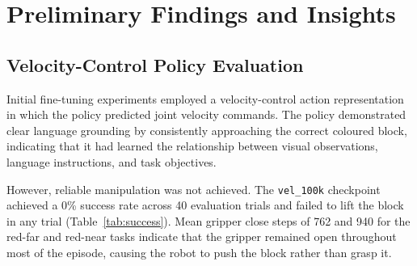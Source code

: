 \documentclass[conference, 12pt]{IEEEtran}
\begin{document}




\section{Preliminary Findings and Insights}
\label{sec:findings}
\subsection{Velocity-Control Policy Evaluation}
Initial fine-tuning experiments employed a velocity-control action representation in which the policy predicted joint velocity commands. The policy demonstrated clear language grounding by consistently approaching the correct coloured block, indicating that it had learned the relationship between visual observations, language instructions, and task objectives.

However, reliable manipulation was not achieved. The \texttt{vel\_100k} checkpoint achieved a 0\% success rate across 40 evaluation trials and failed to lift the block in any trial (Table~\ref{tab:success}). Mean gripper close steps of 762 and 940 for the red-far and red-near tasks indicate that the gripper remained open throughout most of the episode, causing the robot to push the block rather than grasp it.
\end{document}

